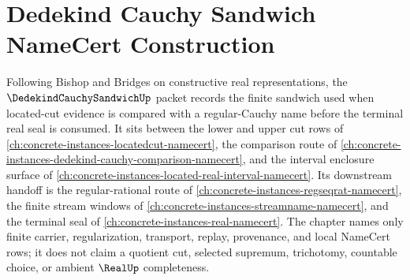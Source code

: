 \chapter{Dedekind Cauchy Sandwich NameCert Construction}
\label{ch:concrete-instances-dedekind-cauchy-sandwich-namecert}

Following Bishop and Bridges on constructive real representations, the $\DedekindCauchySandwichUp$ packet records the finite sandwich used when located-cut evidence is compared with a regular-Cauchy name before the terminal real seal is consumed. It sits between the lower and upper cut rows of \autoref{ch:concrete-instances-locatedcut-namecert}, the comparison route of \autoref{ch:concrete-instances-dedekind-cauchy-comparison-namecert}, and the interval enclosure surface of \autoref{ch:concrete-instances-located-real-interval-namecert}. Its downstream handoff is the regular-rational route of \autoref{ch:concrete-instances-regseqrat-namecert}, the finite stream windows of \autoref{ch:concrete-instances-streamname-namecert}, and the terminal seal of \autoref{ch:concrete-instances-real-namecert}. The chapter names only finite carrier, regularization, transport, replay, provenance, and local NameCert rows; it does not claim a quotient cut, selected supremum, trichotomy, countable choice, or ambient $\RealUp$ completeness.

